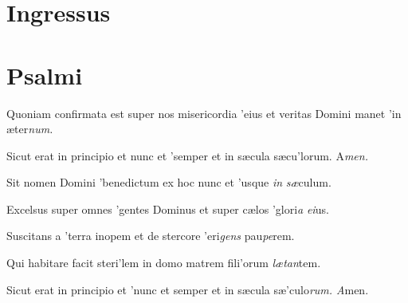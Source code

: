 \documentclass[initial=ZallmanCaps,staff=19,font=greciliae,11pt,a4paper,openany,twoside,choralsign=PfefferMediaeval]{gregorian}
\begin{document}
\section*{Ingressus}
\par
{}\enlargethispage{5em}
\newpage
\section*{Psalmi}
\par
\vskip9mm
\begin{multicols}{2}\setlength{\columnseprule}{0.2px}
Quoniam confirmata est super nos misericordia 'eius \grestar{} et veritas Domini manet 'in æter\textit{num.}\par
{}\par
Sicut erat in principio et nunc et 'semper \grestar{} et in sæcula sæcu'lorum. A\textit{men.}\par
\end{multicols}
\vskip6bp
\par
\vskip9mm
\begin{multicols}{2}\setlength{\columnseprule}{0.2px}
Sit nomen Domini 'benedictum \grestar{} ex hoc nunc et 'usque \textit{in} \textit{sæ}culum.\par
{}\par
Excelsus super omnes 'gentes Dominus \grestar{} et super cælos 'glori\textit{a} \textit{ei}us.\par
{}\par
Suscitans a 'terra inopem \grestar{} et de stercore 'eri\textit{gens} pau\textit{pe}rem.\par
{}\par
Qui habitare facit steri'lem in domo \grestar{} matrem fili'orum \textit{lætan}tem.\par
{}\par
Sicut erat in principio et 'nunc et semper \grestar{} et in sæcula sæ'culo\textit{rum. A}men.\par
\end{multicols}
\end{document}
